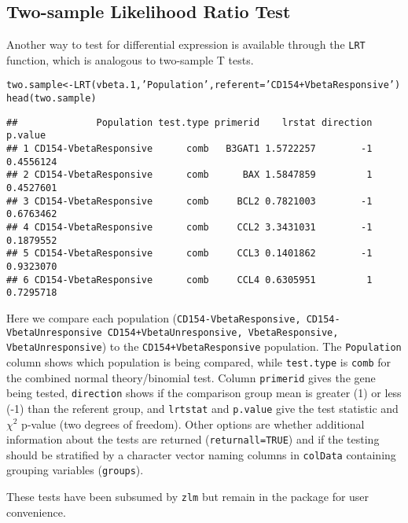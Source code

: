 \documentclass{article}\usepackage[]{graphicx}\usepackage[usenames,dvipsnames]{color}
\newcommand{\hlstr}[1]{\textcolor[rgb]{0.251,0.627,0.251}{#1}}%
\newcommand{\hlstd}[1]{\textcolor[rgb]{0.251,0.251,0.251}{#1}}%
\newcommand{\hlkwb}[1]{\textcolor[rgb]{0,0,0}{#1}}%
\newcommand{\hlkwc}[1]{\textcolor[rgb]{0.251,0.251,0.251}{#1}}%
\newcommand{\hlkwd}[1]{\textcolor[rgb]{0.878,0.439,0.125}{#1}}%
\newenvironment{knitrout}{}{} %
\begin{document}
\subsection{Two-sample Likelihood Ratio Test}
  Another way to test for differential expression is available through
  the \texttt{LRT} function, which is analogous to two-sample T tests.
\begin{knitrout}
\color{fgcolor}\begin{kframe}
\begin{alltt}
\hlstd{two.sample} \hlkwb{<-} \hlkwd{LRT}\hlstd{(vbeta.1,} \hlstr{'Population'}\hlstd{,} \hlkwc{referent}\hlstd{=}\hlstr{'CD154+VbetaResponsive'}\hlstd{)}
\hlkwd{head}\hlstd{(two.sample)}
\end{alltt}
\begin{verbatim}
##              Population test.type primerid    lrstat direction   p.value
## 1 CD154-VbetaResponsive      comb   B3GAT1 1.5722257        -1 0.4556124
## 2 CD154-VbetaResponsive      comb      BAX 1.5847859         1 0.4527601
## 3 CD154-VbetaResponsive      comb     BCL2 0.7821003        -1 0.6763462
## 4 CD154-VbetaResponsive      comb     CCL2 3.3431031        -1 0.1879552
## 5 CD154-VbetaResponsive      comb     CCL3 0.1401862        -1 0.9323070
## 6 CD154-VbetaResponsive      comb     CCL4 0.6305951         1 0.7295718
\end{verbatim}
\end{kframe}
\end{knitrout}

Here we compare each population (\texttt{CD154-VbetaResponsive, CD154-VbetaUnresponsive CD154+VbetaUnresponsive, VbetaResponsive, VbetaUnresponsive}) to the \texttt{CD154+VbetaResponsive} population.
  The \texttt{Population} column shows which population is being
  compared, while \texttt{test.type} is \texttt{comb} for the combined
  normal theory/binomial test.  Column \texttt{primerid} gives the
  gene being tested, \texttt{direction} shows if the comparison group
  mean is greater (1) or less (-1) than the referent group, and
  \texttt{lrtstat} and \texttt{p.value} give the test statistic and
  $\chi^2$ p-value (two degrees of freedom).
Other options are whether additional information about the tests are
returned (\texttt{returnall=TRUE}) and if the testing should be
stratified by a character vector naming columns in \texttt{colData} 
containing grouping variables (\texttt{groups}).

These tests have been subsumed by \texttt{zlm} but
remain in the package for user convenience.
\end{document}

